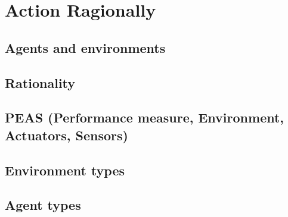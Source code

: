\chapter{Action Ragionally}
\section{Agents and environments}
\section{Rationality}
\section{PEAS (Performance measure, Environment, Actuators, Sensors)}
\section{Environment types}
\section{Agent types}
